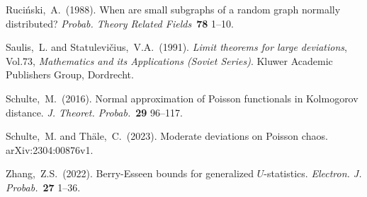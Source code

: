\documentclass[bj,authoryear,noshowframe]{imsart}
\theoremstyle{plain}
\theoremstyle{remark}
\begin{document}
\begin{thebibliography}{4}
  Ruci{\'n}ski,~A.~(1988).
  When are small subgraphs of a random graph normally distributed?
  \textit{Probab. Theory Related Fields}~\textbf{78} 1--10.

  Saulis,~L. and Statulevi\v{c}ius,~V.A.~(1991).
  \textit{Limit theorems for large deviations}, Vol.73, {\em
    Mathematics and its Applications (Soviet Series)}.
  \newblock Kluwer Academic Publishers Group, Dordrecht.

  Schulte,~M.~(2016).
  Normal approximation of {P}oisson functionals in {K}olmogorov distance.
  \textit{J. Theoret. Probab.}~\textbf{29} 96--117.

  Schulte,~M. and Th{\"a}le,~C.~(2023).
  Moderate deviations on {P}oisson chaos.
  arXiv:2304:00876v1.

  Zhang,~Z.S.~(2022).
  Berry-{E}sseen bounds for generalized {$U$}-statistics.
  \textit{Electron. J. Probab.}~\textbf{27} 1--36.


\end{thebibliography}
\end{document}
